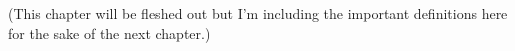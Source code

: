 {%



(This chapter will be fleshed out but I'm including the important definitions here for the sake of the next chapter.)
}